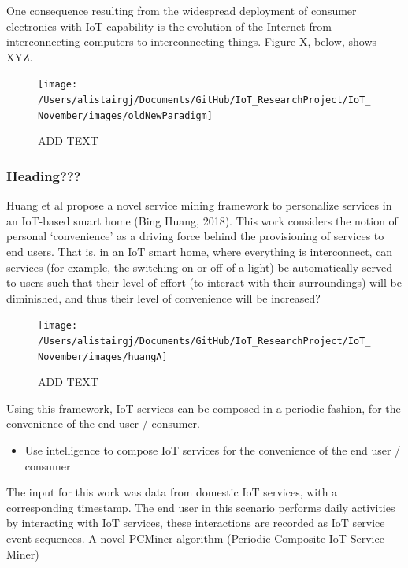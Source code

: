 \documentclass[11pt,]{article}
\providecommand{\tightlist}{%
  \setlength{\itemsep}{0pt}\setlength{\parskip}{0pt}}
\begin{document}
One consequence resulting from the widespread deployment of consumer
electronics with IoT capability is the evolution of the Internet from
interconnecting computers to interconnecting things. Figure X, below,
shows XYZ.

\begin{figure}[H]

{\centering \texttt{[image: /Users/alistairgj/Documents/GitHub/IoT\_ResearchProject/IoT\_November/images/oldNewParadigm]} 

}

\caption{ADD TEXT}\label{fig:unnamed-chunk-6}
\end{figure}

\hypertarget{heading}{%
\subsubsection{Heading???}\label{heading}}

Huang et al propose a novel service mining framework to personalize
services in an IoT-based smart home (Bing Huang, 2018). This work
considers the notion of personal `convenience' as a driving force behind
the provisioning of services to end users. That is, in an IoT smart
home, where everything is interconnect, can services (for example, the
switching on or off of a light) be automatically served to users such
that their level of effort (to interact with their surroundings) will be
diminished, and thus their level of convenience will be increased?

\begin{figure}[H]

{\centering \texttt{[image: /Users/alistairgj/Documents/GitHub/IoT\_ResearchProject/IoT\_November/images/huangA]} 

}

\caption{ADD TEXT}\label{fig:unnamed-chunk-7}
\end{figure}

Using this framework, IoT services can be composed in a periodic
fashion, for the convenience of the end user / consumer.

\begin{itemize}
\tightlist
\item
  Use intelligence to compose IoT services for the convenience of the
  end user / consumer
\end{itemize}

The input for this work was data from domestic IoT services, with a
corresponding timestamp. The end user in this scenario performs daily
activities by interacting with IoT services, these interactions are
recorded as IoT service event sequences. A novel PCMiner algorithm
(Periodic Composite IoT Service Miner)
\end{document}

